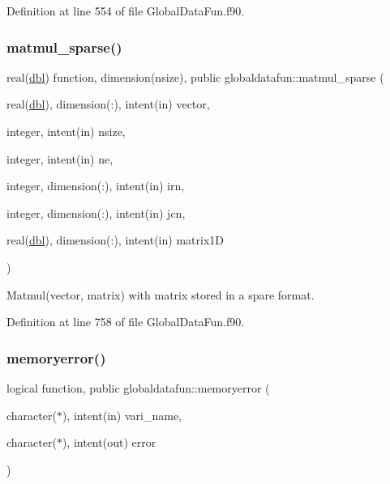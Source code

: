 Definition at line 554 of file Global\+Data\+Fun.\+f90.

\mbox{\label{namespaceglobaldatafun_a370a248c97771d5e9b8410dedbfb548c}} 
\subsubsection{\texorpdfstring{matmul\+\_\+sparse()}{matmul\_sparse()}}
{\footnotesize\ttfamily real(\hyperlink{namespaceglobaldatafun_a5008801201dd34f2af8eae07756befb4}{dbl}) function, dimension(nsize), public globaldatafun\+::matmul\+\_\+sparse (\begin{DoxyParamCaption}\item[{real(\hyperlink{namespaceglobaldatafun_a5008801201dd34f2af8eae07756befb4}{dbl}), dimension(\+:), intent(in)}]{vector,  }\item[{integer, intent(in)}]{nsize,  }\item[{integer, intent(in)}]{ne,  }\item[{integer, dimension(\+:), intent(in)}]{irn,  }\item[{integer, dimension(\+:), intent(in)}]{jcn,  }\item[{real(\hyperlink{namespaceglobaldatafun_a5008801201dd34f2af8eae07756befb4}{dbl}), dimension(\+:), intent(in)}]{matrix1D }\end{DoxyParamCaption})}



Matmul(vector, matrix) with matrix stored in a spare format. 



Definition at line 758 of file Global\+Data\+Fun.\+f90.

\mbox{\label{namespaceglobaldatafun_af28c2b9df0d5a1ef886c3d242fc15205}} 
\subsubsection{\texorpdfstring{memoryerror()}{memoryerror()}}
{\footnotesize\ttfamily logical function, public globaldatafun\+::memoryerror (\begin{DoxyParamCaption}\item[{character($\ast$), intent(in)}]{vari\+\_\+name,  }\item[{character($\ast$), intent(out)}]{error }\end{DoxyParamCaption})}



